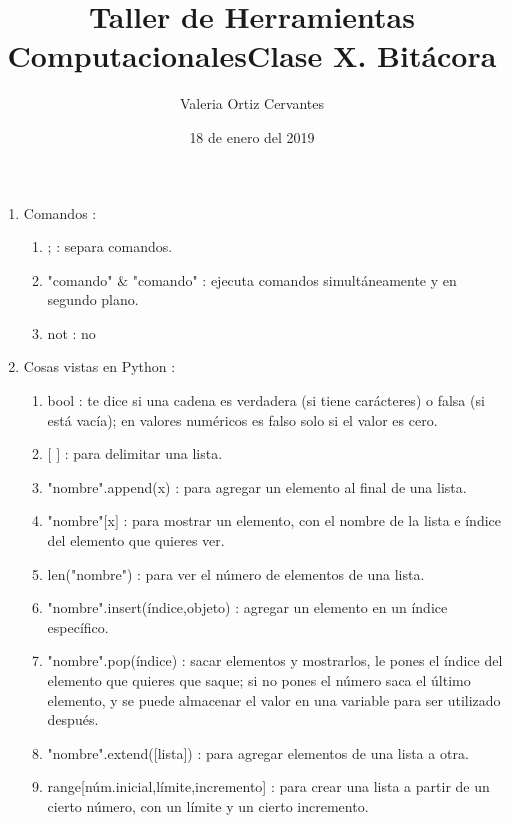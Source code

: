 \documentclass{article}
\title{\Huge Taller de Herramientas Computacionales}
\author{Valeria Ortiz Cervantes}
\date{18 de enero del 2019}
\begin{document}
	\maketitle
	\newpage
	\title{Clase X. Bitácora\\}
	\begin{enumerate}
		\item Comandos :
		\begin{enumerate}
			\item ; : separa comandos.
			\item "comando" $\&$ "comando" : ejecuta comandos simultáneamente y en segundo plano.
			\item not : no
		\end{enumerate}
		\item Cosas vistas en Python :
		\begin{enumerate}
			\item bool : te dice si una cadena es verdadera (si tiene carácteres) o falsa (si está vacía); en valores numéricos es falso solo si el valor es cero.
			\item $[$ $]$ : para delimitar una lista.
			\item "nombre".append(x) : para agregar un elemento al final de una lista.
			\item "nombre"$[$x$]$ : para mostrar un elemento, con el nombre de la lista e índice del elemento que quieres ver.
			\item len("nombre") : para ver el número de elementos de una lista.
			\item "nombre".insert(índice,objeto) : agregar un elemento en un índice específico. 
			\item "nombre".pop(índice) : sacar elementos y mostrarlos, le pones el índice del elemento que quieres que saque; si no pones el número saca el último elemento, y se puede almacenar el valor en una variable para ser utilizado después.
			\item "nombre".extend([lista]) : para agregar elementos de una lista a otra.
			\item range[núm.inicial,límite,incremento] : para crear una lista a partir de un cierto número, con un límite y un cierto incremento.
			\end{enumerate}
	\end{enumerate}
\end{document}

